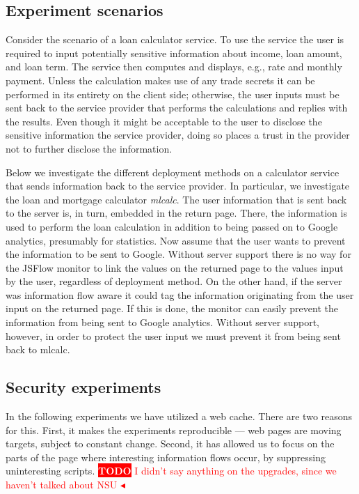\documentclass{llncs}
\newcommand{\todo}[1]{\colorbox{red}{\textcolor{white}{\sffamily\bfseries\scriptsize TODO}} \textcolor{red}{#1} \textcolor{red}{$\blacktriangleleft$}}
\begin{document}
\subsection{Experiment scenarios}

Consider the scenario of a loan calculator service. To use the service the
user is required to input potentially sensitive information about income, 
loan amount, and loan term. The service then computes and displays, e.g., 
rate and monthly payment. Unless the calculation makes use of any trade secrets
it can be performed in its entirety on the client side; otherwise, the
user inputs must be sent back to the service provider that performs the
calculations and replies with the results. Even though it might be acceptable to 
the user to disclose the sensitive information the service provider,
doing so places a trust in the provider not to further disclose the information.

Below we investigate the different deployment methods on a calculator service
that sends information back to the service provider. In particular, we
investigate the loan and mortgage calculator \emph{mlcalc}. The user
information that is sent back to the server is, in turn, embedded in the return
page. There, the information is used to perform the loan calculation in
addition to being passed on to Google analytics, presumably for statistics. Now
assume that the user wants to prevent the information to be sent to Google.
Without server support there is no way for the JSFlow monitor to link the
values on the returned page to the values input by the user, regardless of
deployment method. On the other hand, if the server was information flow aware
it could tag the information originating from the user input on the returned
page. If this is done, the monitor can easily prevent the information from
being sent to Google analytics. Without server support, however, in order to
protect the user input we must prevent it from being sent back to mlcalc. 

\subsection{Security experiments}
In the following experiments we have utilized a web cache. There are two
reasons for this. First, it makes the experiments reproducible --- web pages 
are moving targets, subject to constant change. Second, it has allowed us
to focus on the parts of the page where interesting information flows occur,
by suppressing uninteresting scripts.
\todo{I didn't say anything on the upgrades, since we haven't talked about NSU}
\end{document}

